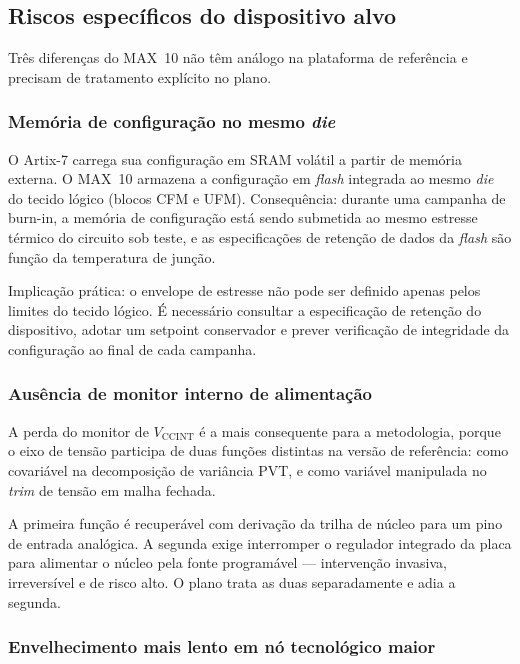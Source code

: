 \documentclass[11pt,a4paper]{article}
\begin{document}
\subsection{Riscos específicos do dispositivo alvo}

Três diferenças do MAX~10 não têm análogo na plataforma de referência e precisam de
tratamento explícito no plano.

\subsubsection{Memória de configuração no mesmo \emph{die}}

O Artix-7 carrega sua configuração em SRAM volátil a partir de memória externa. O
MAX~10 armazena a configuração em \emph{flash} integrada ao mesmo \emph{die} do tecido
lógico (blocos CFM e UFM). Consequência: durante uma campanha de burn-in, a memória de
configuração está sendo submetida ao mesmo estresse térmico do circuito sob teste, e as
especificações de retenção de dados da \emph{flash} são função da temperatura de junção.

Implicação prática: o envelope de estresse não pode ser definido apenas pelos limites
do tecido lógico. É necessário consultar a especificação de retenção do dispositivo,
adotar um setpoint conservador e prever verificação de integridade da configuração ao
final de cada campanha.

\subsubsection{Ausência de monitor interno de alimentação}
\label{sec:ausencia-vcore}

A perda do monitor de $V_\text{CCINT}$ é a mais consequente para a metodologia, porque
o eixo de tensão participa de duas funções distintas na versão de referência:
como covariável na decomposição de variância PVT, e como variável manipulada no
\emph{trim} de tensão em malha fechada.

A primeira função é recuperável com derivação da trilha de núcleo para um pino de
entrada analógica. A segunda exige interromper o regulador integrado da placa para
alimentar o núcleo pela fonte programável --- intervenção invasiva, irreversível e de
risco alto. O plano trata as duas separadamente e adia a segunda.

\subsubsection{Envelhecimento mais lento em nó tecnológico maior}
\label{sec:envelhecimento-lento}
\end{document}
